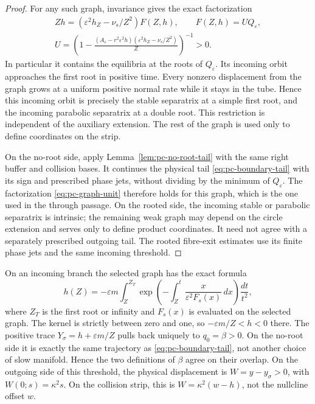 \begin{proof}
For any such graph, invariance gives the exact factorization
\begin{equation}\label{eq:pc-graph-unit}
 \begin{gathered}
 Zh=(\varepsilon^2h_Z-\nu_s/Z^2)F(Z,h),\qquad
 F(Z,h)=UQ_\varepsilon,\\
 U=\left(1-\frac{(A_\varepsilon-r^2\varepsilon^2h)
                     (\varepsilon^2h_Z-\nu_s/Z^2)}Z\right)^{-1}>0.
 \end{gathered}
\end{equation}
In particular it contains the equilibria at the roots of
$Q_\varepsilon$. Its incoming orbit approaches the first root in
positive time. Every nonzero displacement from the graph grows at a
uniform positive normal rate while it stays in the tube. Hence this
incoming orbit is precisely the stable separatrix at a simple first
root, and the incoming parabolic separatrix at a double root. This
restriction is independent of the auxiliary extension. The rest of
the graph is used only to define coordinates on the strip.

On the no-root side, apply Lemma~\ref{lem:pc-no-root-tail} with the
same right buffer and collision bases. It continues the physical tail
\eqref{eq:pc-boundary-tail} with its sign and prescribed phase jets,
without dividing by the minimum of $Q_\varepsilon$. The factorization
\eqref{eq:pc-graph-unit} therefore holds for this graph, which is the
one used in the through passage. On the rooted side, the incoming
stable or parabolic separatrix is intrinsic; the remaining weak graph
may depend on the circle extension and serves only to define product
coordinates. It need not agree with a separately prescribed outgoing
tail. The rooted fibre-exit estimates use its finite phase jets and the
same incoming threshold.
\end{proof}

On an incoming branch the selected graph has the exact formula
\begin{equation}
\label{eq:pc-canonical-graph}
 h(Z)=-\varepsilon m\int_Z^{Z_T}
 \exp\left(-\int_Z^t\frac{x}{\varepsilon^2F_s(x)}\,dx\right)
                                  \frac{dt}{t^2},
\end{equation}
where $Z_T$ is the first root or infinity and $F_s(x)$ is evaluated on
the selected graph. The kernel is strictly between zero and one, so
$-\varepsilon m/Z<h<0$ there.
The positive trace $Y_\sigma=h+\varepsilon m/Z$ pulls back uniquely
to $q_0=\beta>0$. On the no-root side it is exactly the same
trajectory as \eqref{eq:pc-boundary-tail}, not another choice of slow
manifold. Hence the two definitions of $\beta$ agree on their overlap.
On the outgoing side of this threshold, the physical displacement is
$W=y-y_\sigma>0$, with $W(0;s)=\kappa^2s$. On the collision strip,
this is $W=\kappa^2(w-h)$, not the nullcline offset $w$.

